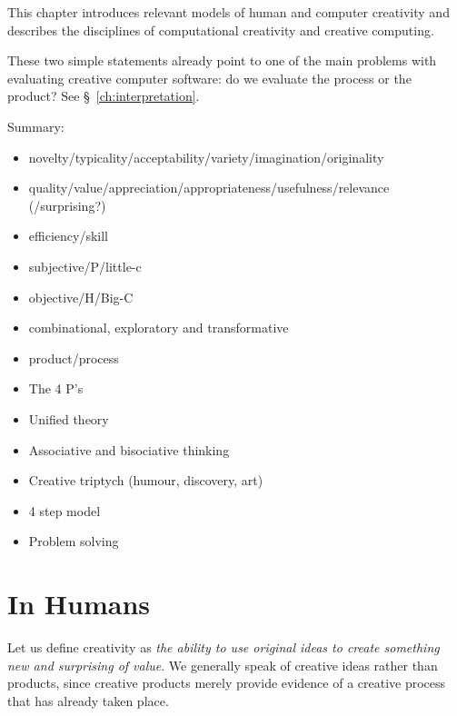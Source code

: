 This chapter introduces relevant models of human and computer creativity and describes the disciplines of computational creativity and creative computing.

\begin{draft}
  These two simple statements already point to one of the main problems with evaluating creative computer software: do we evaluate the process or the product? See §~\ref{ch:interpretation}.
\end{draft}


\clearpage

\vspace*{\fill}

\begin{shaded}
  Summary:
  \begin{itemize}
    \item novelty/typicality/acceptability/variety/imagination/originality
    \item quality/value/appreciation/appropriateness/usefulness/relevance (/surprising?)
    \item efficiency/skill
    \item subjective/P/little-c
    \item objective/H/Big-C
    \item combinational, exploratory and transformative
    \item product/process
    \item The 4 P’s
    \item Unified theory
    \item Associative and bisociative thinking
    \item Creative triptych (humour, discovery, art)
    \item 4 step model
    \item Problem solving
  \end{itemize}
\end{shaded}

\clearpage


\section{In Humans}


Let us define creativity as \emph{the ability to use original ideas to create something new and surprising of value}. We generally speak of creative ideas rather than products, since creative products merely provide evidence of a creative process that has already taken place.

